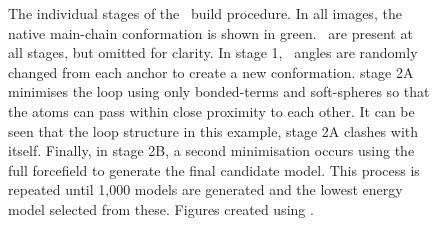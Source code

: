 \begin{figure}[htbp]
  \begin{center}


    \caption[The individual stages of the \cloop\ build procedure]{The individual stages of the \cloop\ build procedure. In
    all images, the native main-chain conformation is shown in green. \Sidechains\ are present
    at all stages, but omitted for clarity. In
    stage 1, \phipsi\ angles are randomly changed from each anchor to create a new conformation. stage 2A minimises the loop using only bonded-terms and
soft-spheres so that
the atoms can pass within close proximity to each other. It can be seen that the loop structure
in this example, stage 2A clashes with itself. Finally, in stage 2B, a second minimisation occurs using the full  forcefield to generate the final candidate model. This process is repeated until 1,000 models are generated and the lowest energy model selected from these. Figures created using \pymolV.}
    \label{fig:methcomp:cloop}
  \end{center}
\end{figure}

